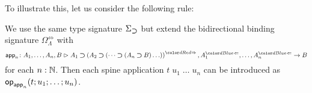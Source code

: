 To illustrate this, let us consider the following rule:
\bgroup
\small
  \begin{mathpar}
  \end{mathpar}
\egroup
We use the same type signature $\Sigma_{\bto}$ but extend the bidirectional binding signature $\Omega_{\Lambda}^{\Leftrightarrow}$ with 
\[
  \aritysymbol{\mathsf{app}_n}{A_1,\ldots, A_n, B}{A_1 \bto \left(A_2 \bto \left(\dots \bto \left(A_n \bto B\right)\ldots\right)\right)^{\syn}, A_1^{\chk}, \ldots, A_n^{\chk}}{B}
\]
for each $n : \N$.
Then each spine application $t\;u_1\;\ldots\;u_n$ can be introduced as $\tmOp_{\mathsf{app}_n}(t; u_1; \ldots; u_n)$.
